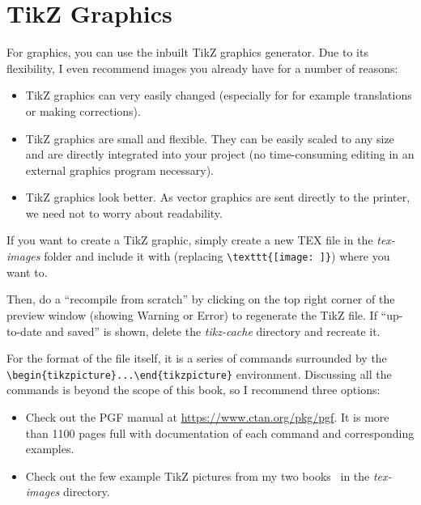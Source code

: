 \section{TikZ Graphics}\label{sec:c1_tikzgraphics}

For graphics, you can use the inbuilt TikZ graphics generator. Due to its
flexibility, I even recommend images you already have for a number of reasons:

\begin{itemize}
    \item TikZ graphics can very easily changed (especially for for example
    translations or making corrections).
    \item TikZ graphics are small and flexible. They can be easily scaled to any
    size and are directly integrated into your project (no time-consuming
    editing in an external graphics program necessary).
    \item TikZ graphics look better. As vector graphics are sent directly to the
    printer, we need not to worry about readability.
\end{itemize}

If you want to create a TikZ graphic, simply create a new TEX file in the
\textit{tex-images} folder and include it with \lstinline[language=Tex]!! %
(replacing \lstinline[language=Tex]!\texttt{[image: ]}!) where you want to. 

Then, do a ``recompile from scratch'' by clicking on the top right corner of the
preview window (showing Warning or Error) to regenerate the TikZ file. If
``up-to-date and saved'' is shown, delete the \textit{tikz-cache} directory and
recreate it. 

For the format of the file itself, it is a series of commands surrounded by the
\lstinline[language=Tex]!\begin{tikzpicture}...\end{tikzpicture}!%
environment. Discussing all the commands is beyond the scope of this book, so I recommend three options:

\begin{itemize}
    \item Check out the PGF manual at \url{https://www.ctan.org/pkg/pgf}. It is
    more than 1100 pages full with documentation of each command and
    corresponding examples.
    \item Check out the few example TikZ pictures from my two books~\cite{PFH1E, PFH2E} in the \textit{tex-images} directory.
\end{itemize}